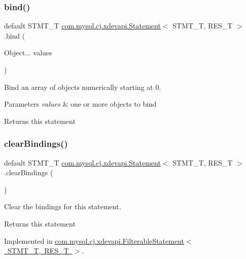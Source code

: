 \subsubsection{\texorpdfstring{bind()}{bind()}\hspace{0.1cm}{\footnotesize\ttfamily [4/4]}}
{\footnotesize\ttfamily default S\+T\+M\+T\+\_\+T \mbox{\hyperlink{interfacecom_1_1mysql_1_1cj_1_1xdevapi_1_1_statement}{com.\+mysql.\+cj.\+xdevapi.\+Statement}}$<$ S\+T\+M\+T\+\_\+T, R\+E\+S\+\_\+T $>$.bind (\begin{DoxyParamCaption}\item[{Object...}]{values }\end{DoxyParamCaption})}

Bind an array of objects numerically starting at 0.


\begin{DoxyParams}{Parameters}
{\em values} & one or more objects to bind \\
\hline
\end{DoxyParams}
\begin{DoxyReturn}{Returns}
this statement 
\end{DoxyReturn}
\mbox{\label{interfacecom_1_1mysql_1_1cj_1_1xdevapi_1_1_statement_a7be7ea383c05f9b1662b75eed8982ff1}} 
\subsubsection{\texorpdfstring{clear\+Bindings()}{clearBindings()}}
{\footnotesize\ttfamily default S\+T\+M\+T\+\_\+T \mbox{\hyperlink{interfacecom_1_1mysql_1_1cj_1_1xdevapi_1_1_statement}{com.\+mysql.\+cj.\+xdevapi.\+Statement}}$<$ S\+T\+M\+T\+\_\+T, R\+E\+S\+\_\+T $>$.clear\+Bindings (\begin{DoxyParamCaption}{ }\end{DoxyParamCaption})}

Clear the bindings for this statement.

\begin{DoxyReturn}{Returns}
this statement 
\end{DoxyReturn}


Implemented in \mbox{\hyperlink{classcom_1_1mysql_1_1cj_1_1xdevapi_1_1_filterable_statement_a6f81659cd181c72dea83972c18438f56}{com.\+mysql.\+cj.\+xdevapi.\+Filterable\+Statement$<$ S\+T\+M\+T\+\_\+\+T, R\+E\+S\+\_\+\+T $>$}}.

